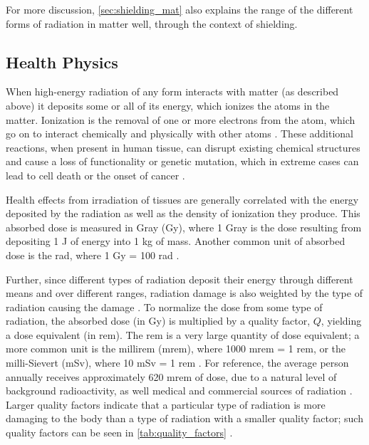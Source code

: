 \documentclass{report}
\begin{document}
 
 For more discussion, \autoref{sec:shielding_mat} also explains the range of the different forms of radiation in matter well, through the context of shielding.




\subsection{Health Physics}

When high-energy radiation of any form interacts with matter (as described above) it deposits some or all of its energy, which ionizes the atoms in the matter. Ionization is the removal of one or more electrons from the atom, which go on to interact chemically and physically with other atoms \cite{krane1987introductory}. These additional reactions, when present in human tissue, can disrupt existing chemical structures and cause a loss of functionality or genetic mutation, which in extreme cases can lead to cell death or the onset of cancer \cite{Stabin2007}. 

Health effects from irradiation of tissues are generally correlated with the energy deposited by the radiation as well as the density of ionization they produce. This absorbed dose is measured in Gray (Gy), where 1 Gray is the dose resulting from depositing 1 J of energy into 1 kg of mass. Another common unit of absorbed dose is the rad, where 1 Gy = 100 rad \cite{Stabin2007}.


Further, since different types of radiation deposit their energy through different means and over different ranges, radiation damage is also weighted by the type of radiation causing the damage \cite{Cherry2012}. To normalize the dose from some type of radiation, the absorbed dose (in Gy) is multiplied by a quality factor, \(Q\), yielding a dose equivalent (in rem). The rem is a very large quantity of dose equivalent; a more common unit is the millirem (mrem), where 1000 mrem = 1 rem, or the milli-Sievert (mSv), where 10 mSv = 1 rem \cite{Cember2008}. For reference, the average person annually receives approximately 620 mrem of dose, due to a natural level of background radioactivity, as well medical and commercial sources of radiation \cite{U.S.NuclearRegulatoryCommission2014}. Larger quality factors indicate that a particular type of radiation is more damaging to the body than a type of radiation with a smaller quality factor; such quality factors can be seen in \autoref{tab:quality_factors} \cite{Cember2008}.
\end{document}
